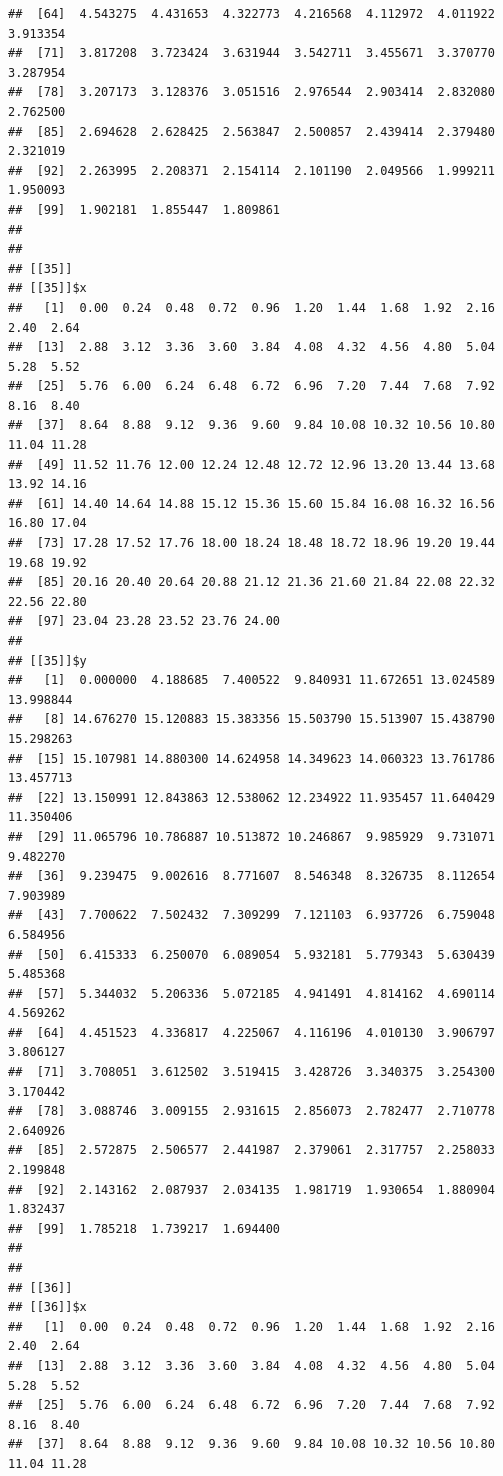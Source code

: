 \documentclass[
  ignorenonframetext,
]{beamer}
\begin{document}
\begin{frame}[fragile]{}
\begin{verbatim}
##  [64]  4.543275  4.431653  4.322773  4.216568  4.112972  4.011922  3.913354
##  [71]  3.817208  3.723424  3.631944  3.542711  3.455671  3.370770  3.287954
##  [78]  3.207173  3.128376  3.051516  2.976544  2.903414  2.832080  2.762500
##  [85]  2.694628  2.628425  2.563847  2.500857  2.439414  2.379480  2.321019
##  [92]  2.263995  2.208371  2.154114  2.101190  2.049566  1.999211  1.950093
##  [99]  1.902181  1.855447  1.809861
## 
## 
## [[35]]
## [[35]]$x
##   [1]  0.00  0.24  0.48  0.72  0.96  1.20  1.44  1.68  1.92  2.16  2.40  2.64
##  [13]  2.88  3.12  3.36  3.60  3.84  4.08  4.32  4.56  4.80  5.04  5.28  5.52
##  [25]  5.76  6.00  6.24  6.48  6.72  6.96  7.20  7.44  7.68  7.92  8.16  8.40
##  [37]  8.64  8.88  9.12  9.36  9.60  9.84 10.08 10.32 10.56 10.80 11.04 11.28
##  [49] 11.52 11.76 12.00 12.24 12.48 12.72 12.96 13.20 13.44 13.68 13.92 14.16
##  [61] 14.40 14.64 14.88 15.12 15.36 15.60 15.84 16.08 16.32 16.56 16.80 17.04
##  [73] 17.28 17.52 17.76 18.00 18.24 18.48 18.72 18.96 19.20 19.44 19.68 19.92
##  [85] 20.16 20.40 20.64 20.88 21.12 21.36 21.60 21.84 22.08 22.32 22.56 22.80
##  [97] 23.04 23.28 23.52 23.76 24.00
## 
## [[35]]$y
##   [1]  0.000000  4.188685  7.400522  9.840931 11.672651 13.024589 13.998844
##   [8] 14.676270 15.120883 15.383356 15.503790 15.513907 15.438790 15.298263
##  [15] 15.107981 14.880300 14.624958 14.349623 14.060323 13.761786 13.457713
##  [22] 13.150991 12.843863 12.538062 12.234922 11.935457 11.640429 11.350406
##  [29] 11.065796 10.786887 10.513872 10.246867  9.985929  9.731071  9.482270
##  [36]  9.239475  9.002616  8.771607  8.546348  8.326735  8.112654  7.903989
##  [43]  7.700622  7.502432  7.309299  7.121103  6.937726  6.759048  6.584956
##  [50]  6.415333  6.250070  6.089054  5.932181  5.779343  5.630439  5.485368
##  [57]  5.344032  5.206336  5.072185  4.941491  4.814162  4.690114  4.569262
##  [64]  4.451523  4.336817  4.225067  4.116196  4.010130  3.906797  3.806127
##  [71]  3.708051  3.612502  3.519415  3.428726  3.340375  3.254300  3.170442
##  [78]  3.088746  3.009155  2.931615  2.856073  2.782477  2.710778  2.640926
##  [85]  2.572875  2.506577  2.441987  2.379061  2.317757  2.258033  2.199848
##  [92]  2.143162  2.087937  2.034135  1.981719  1.930654  1.880904  1.832437
##  [99]  1.785218  1.739217  1.694400
## 
## 
## [[36]]
## [[36]]$x
##   [1]  0.00  0.24  0.48  0.72  0.96  1.20  1.44  1.68  1.92  2.16  2.40  2.64
##  [13]  2.88  3.12  3.36  3.60  3.84  4.08  4.32  4.56  4.80  5.04  5.28  5.52
##  [25]  5.76  6.00  6.24  6.48  6.72  6.96  7.20  7.44  7.68  7.92  8.16  8.40
##  [37]  8.64  8.88  9.12  9.36  9.60  9.84 10.08 10.32 10.56 10.80 11.04 11.28

\end{verbatim}
\end{frame}
\end{document}
